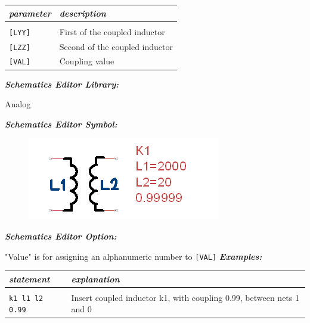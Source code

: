 
\begin{longtable}{l l}
\textit{parameter} & \textit{description} \\ \hline \\ \vspace{-0.8\parskip}
\texttt{[LYY]} & First of the coupled inductor \\
\texttt{[LZZ]} & Second of the coupled inductor \\
\texttt{[VAL]} & Coupling value \\ 
\end{longtable}


\textbf{\textit{Schematics Editor Library:}}

Analog

\textbf{\textit{Schematics Editor Symbol:}}

\begin{figure}[htb]
  \begin{center}
    \includegraphics[height=0.08\textheight]{./pics/SpiceEl/CInductor.png}
  \end{center}
\end{figure}

\textbf{\textit{Schematics Editor Option:}}

"\textsf{Value}" is for assigning an alphanumeric number to \texttt{[VAL]}
\newpage
\textbf{\textit{Examples:}}

\begin{longtable}{l l}
\textit{statement} & \textit{explanation} \\ \hline \\ \vspace{-0.8\parskip} 
\texttt{k1 l1 l2 0.99} & {\small Insert coupled inductor k1, with coupling 0.99, between nets 1 and 0} \\
\end{longtable}


